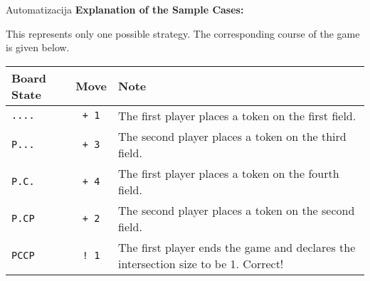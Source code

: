 \begin{statement}[
  problempoints=100,
  timelimit=6 seconds,
  memorylimit=512 MiB,
]{Automatizacija}
\textbf{Explanation of the Sample Cases:}  

This represents only one possible strategy.  
The corresponding course of the game is given below.

{\renewcommand{\arraystretch}{1.4}
  \setlength{\tabcolsep}{6pt}
  \begin{tabular}{lcl}
    Board State & Move & Note \\ \midrule
    \texttt{....} & \texttt{+ 1} & The first player places a token on the first field. \\
    \texttt{P...} & \texttt{+ 3} & The second player places a token on the third field. \\
    \texttt{P.C.} & \texttt{+ 4} & The first player places a token on the fourth field. \\
    \texttt{P.CP} & \texttt{+ 2} & The second player places a token on the second field. \\
    \texttt{PCCP} & \texttt{\frenchspacing! 1} & The first player ends the game and 
    declares the intersection size to be 1. Correct! \\

\end{tabular}}

\end{statement}
